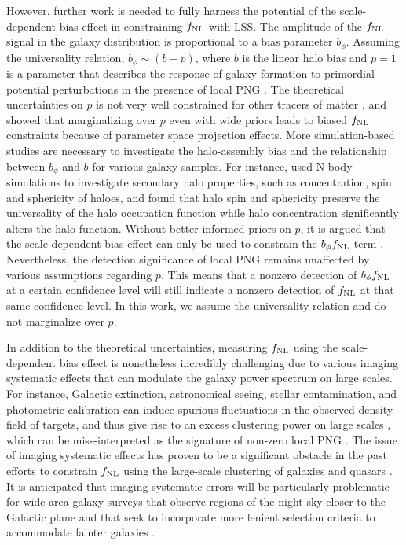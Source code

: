 However, further work is needed to fully harness the potential of the scale-dependent bias effect in constraining $f_{\rm NL}$ with LSS. The amplitude of the $f_{\rm NL}$ signal in the galaxy distribution is proportional to a bias parameter $b_{\phi}$. Assuming the universality relation, $b_{\phi} \sim (b - p)$, where $b$ is the linear halo bias and $p=1$ is a parameter that describes the response of galaxy formation to primordial potential perturbations in the presence of local PNG \citep[see, e.g.,][]{slosar2008constraints}. The theoretical uncertainties on $p$ is not very well constrained for other tracers of matter \citep{2020JCAP...12..013B, 2020JCAP...12..031B}, and \cite{2022JCAP...11..013B} showed that marginalizing over $p$ even with wide priors leads to biased $f_{\rm NL}$ constraints because of parameter space projection effects. More simulation-based studies are necessary to investigate the halo-assembly bias and the relationship between $b_{\phi}$ and $b$ for various galaxy samples. For instance, \cite{2023JCAP...01..023L} used N-body simulations to investigate secondary halo properties, such as concentration, spin and sphericity of haloes, and found that halo spin and sphericity preserve the universality of the halo occupation function while halo concentration significantly alters the halo function.  Without better-informed priors on $p$, it is argued that the scale-dependent bias effect can only  be used to constrain the $b_{\phi}f_{\rm NL}$ term \citep[see, e.g.,][]{2020JCAP...12..031B}. Nevertheless, the detection significance of local PNG remains unaffected by various assumptions regarding $p$. This means that a nonzero detection of $b_{\phi}f_{\rm NL}$ at a certain confidence level will still indicate a nonzero detection of $f_{\rm NL}$ at that same confidence level. In this work, we assume the universality relation and do not marginalize over $p$.  

In addition to the theoretical uncertainties, measuring $f_{\rm NL}$ using the scale-dependent bias effect is nonetheless incredibly challenging due to various imaging systematic effects that can modulate the galaxy power spectrum on large scales. For instance, Galactic extinction, astronomical seeing, stellar contamination, and photometric calibration can induce spurious fluctuations in the observed density field of targets, and thus give rise to an excess clustering power on large scales \citep{ross2011, huterer2013calibration}, which can be miss-interpreted as the signature of non-zero local PNG \citep[see, e.g.,][]{PhysRevLett.106.241301}. The issue of imaging systematic effects has proven to be a significant obstacle in the past efforts to constrain $f_{\rm NL}$ using the large-scale clustering of galaxies and quasars \citep[see, e.g.,][]{pullen2013systematic, Ho2015JCAP...05..040H}. It is anticipated that imaging systematic errors will be particularly problematic for wide-area galaxy surveys that observe regions of the night sky closer to the Galactic plane and that seek to incorporate more lenient selection criteria to accommodate fainter galaxies \citep[see, e.g,][]{kitanidis2020imaging}.  



